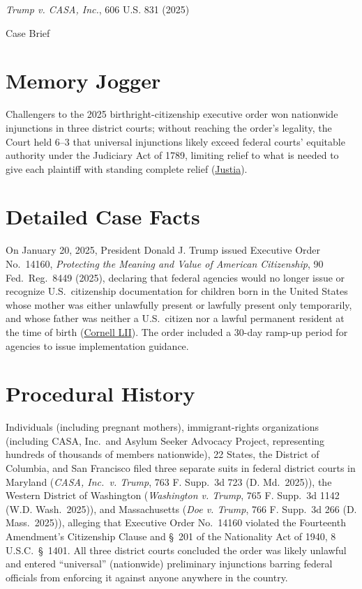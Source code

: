 \documentclass[12pt]{article}
\begin{document}
\begin{center}
{\LARGE \textit{Trump v. CASA, Inc.}, 606 U.S. 831 (2025)\par}
\vspace{0.8em}
{\large Case Brief\par}
\end{center}
\vspace{1em}

\section{Memory Jogger}
Challengers to the 2025 birthright-citizenship executive order won nationwide injunctions in three district courts; without reaching the order's legality, the Court held 6--3 that universal injunctions likely exceed federal courts' equitable authority under the Judiciary Act of 1789, limiting relief to what is needed to give each plaintiff with standing complete relief (\href{https://supreme.justia.com/cases/federal/us/606/24a884/}{Justia}).

\section{Detailed Case Facts}
On January 20, 2025, President Donald J. Trump issued Executive Order No.\ 14160, \textit{Protecting the Meaning and Value of American Citizenship}, 90 Fed.\ Reg.\ 8449 (2025), declaring that federal agencies would no longer issue or recognize U.S.\ citizenship documentation for children born in the United States whose mother was either unlawfully present or lawfully present only temporarily, and whose father was neither a U.S.\ citizen nor a lawful permanent resident at the time of birth (\href{https://www.law.cornell.edu/supremecourt/text/24A884}{Cornell LII}). The order included a 30-day ramp-up period for agencies to issue implementation guidance.

\section{Procedural History}
Individuals (including pregnant mothers), immigrant-rights organizations (including CASA, Inc.\ and Asylum Seeker Advocacy Project, representing hundreds of thousands of members nationwide), 22 States, the District of Columbia, and San Francisco filed three separate suits in federal district courts in Maryland (\textit{CASA, Inc.\ v. Trump}, 763 F. Supp.\ 3d 723 (D. Md.\ 2025)), the Western District of Washington (\textit{Washington v. Trump}, 765 F. Supp.\ 3d 1142 (W.D. Wash.\ 2025)), and Massachusetts (\textit{Doe v. Trump}, 766 F. Supp.\ 3d 266 (D. Mass.\ 2025)), alleging that Executive Order No.\ 14160 violated the Fourteenth Amendment's Citizenship Clause and \S\ 201 of the Nationality Act of 1940, 8 U.S.C.\ \S\ 1401. All three district courts concluded the order was likely unlawful and entered ``universal'' (nationwide) preliminary injunctions barring federal officials from enforcing it against anyone anywhere in the country.
\end{document}
